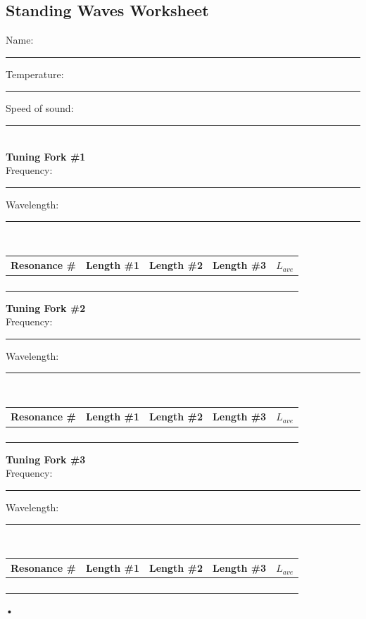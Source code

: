 \documentclass[main.tex]{subfiles}
\begin{document}
\begin{doublespace}
\section{Standing Waves Worksheet}
\begin{flushright}
Name:\rule[-1mm]{5cm}{.1pt}
\end{flushright}
Temperature:\rule[-1mm]{2.5cm}{.1pt} \qquad \qquad Speed of sound:\rule[-1mm]{2.5cm}{.1pt}\\

\noindent
\textbf{Tuning Fork \#1}\\
Frequency:\rule[-1mm]{2.5cm}{.1pt} \qquad \qquad Wavelength:\rule[-1mm]{2.5cm}{.1pt}\\

\begin{tabular}{|c|c|c|c|c@{\hskip 1cm}|}
\hline
Resonance \# & Length \#1 & Length \#2 & Length \#3 & $L_{ave}$\\
\hline
&&&&\\
\hline
&&&&\\
\hline
&&&&\\
\hline
&&&&\\
\hline
\end{tabular} 

\noindent
\textbf{Tuning Fork \#2}\\
Frequency:\rule[-1mm]{2.5cm}{.1pt} \qquad \qquad Wavelength:\rule[-1mm]{2.5cm}{.1pt}\\

\begin{tabular}{|c|c|c|c|c@{\hskip 1cm}|}
\hline
Resonance \# & Length \#1 & Length \#2 & Length \#3 & $L_{ave}$\\
\hline
&&&&\\
\hline
&&&&\\
\hline
&&&&\\
\hline
&&&&\\
\hline
\end{tabular} 

\noindent
\textbf{Tuning Fork \#3}\\
Frequency:\rule[-1mm]{2.5cm}{.1pt} \qquad \qquad Wavelength:\rule[-1mm]{2.5cm}{.1pt}\\

\begin{tabular}{|c|c|c|c|c@{\hskip 1cm}|}
\hline
Resonance \# & Length \#1 & Length \#2 & Length \#3 & $L_{ave}$\\
\hline
&&&&\\
\hline
&&&&\\
\hline
&&&&\\
\hline
&&&&\\
\hline
\end{tabular}•
\end{doublespace}
\end{document}
